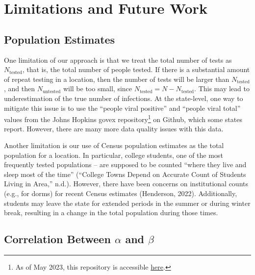 \documentclass[12pt,twoside]{smiththesis}
\begin{document}
\hypertarget{limitations-and-future-work}{%
\section{Limitations and Future Work}\label{limitations-and-future-work}}

\hypertarget{population-estimates}{%
\subsection{Population Estimates}\label{population-estimates}}

One limitation of our approach is that we treat the total number of tests as \(N_{\text{tested}}\), that is, the total number of people tested. If there is a substantial amount of repeat testing in a location, then the number of tests will be larger than \(N_{\text{tested}}\), and then \(N_{\text{untested}}\) will be too small, since \(N_{\text{tested}} = N- N_{\text{tested}}\). This may lead to underestimation of the true number of infections. At the state-level, one way to mitigate this issue is to use the ``people viral positive'' and ``people viral total'' values from the Johns Hopkins govex repository\footnote{As of May 2023, this repository is accessible \href{https://github.com/govex/COVID-19}{here}.} on Github, which some states report. However, there are many more data quality issues with this data.

Another limitation is our use of Census population estimates as the total population for a location.
In particular, college students, one of the most frequently tested populations -- are supposed to be counted ``where they live and sleep most of the time'' ({``College {Towns Depend} on {Accurate Count} of {Students Living} in {Area},''} n.d.). However, there have been concerns on institutional counts (e.g., for dorms) for recent Census estimates (Henderson, 2022). Additionally, students may leave the state for extended periods in the summer or during winter break, resulting in a change in the total population during those times.

\hypertarget{correlation-between-alpha-and-beta}{%
\subsection{\texorpdfstring{Correlation Between \(\alpha\) and \(\beta\)}{Correlation Between \textbackslash alpha and \textbackslash beta}}\label{correlation-between-alpha-and-beta}}
\end{document}
